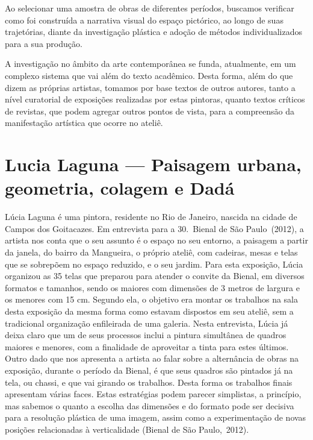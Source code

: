 Ao selecionar uma amostra de obras de diferentes períodos, buscamos
verificar como foi construída a narrativa visual do espaço pictórico,
ao longo de suas trajetórias, diante da investigação plástica e adoção
de métodos individualizados para a sua produção.

\newpage

A investigação no âmbito da arte contemporânea se funda, atualmente, em
um complexo sistema que vai além do texto acadêmico. Desta forma, além
do que dizem as próprias artistas, tomamos por base textos de outros
autores, tanto a nível curatorial de exposições realizadas por estas
pintoras, quanto textos críticos de revistas, que podem agregar outros
pontos de vista, para a compreensão da manifestação artística que
ocorre no ateliê.

\section{Lucia Laguna --- Paisagem urbana, geometria, colagem e Dadá}%
\label{sec:lucia-laguna-paisagem-urbana-geometria-colagem-e-daduxe1}

Lúcia Laguna é uma pintora, residente no Rio de Janeiro, nascida na
cidade de Campos dos Goitacazes. Em entrevista para a 30\textordfeminine.~Bienal de
São Paulo~(2012), a artista nos conta que o seu assunto é o espaço no
seu entorno, a paisagem a partir da janela, do bairro da Mangueira, o
próprio ateliê, com cadeiras, mesas e telas que se sobrepõem no espaço
reduzido, e o seu jardim. Para esta exposição, Lúcia organizou as 35
telas que preparou para atender o convite da Bienal, em diversos
formatos e tamanhos, sendo os maiores com dimensões de 3 metros de
largura e os menores com 15 cm. Segundo ela, o objetivo era montar os
trabalhos na sala desta exposição da mesma forma como estavam dispostos
em seu ateliê, sem a tradicional organização enfileirada de uma
galeria. Nesta entrevista, Lúcia já deixa claro que um de seus
processos inclui a pintura simultânea de quadros maiores e menores, com
a finalidade de aproveitar a tinta para estes últimos. Outro dado que
nos apresenta a artista ao falar sobre a alternância de obras na
exposição, durante o período da Bienal, é que seus quadros são pintados
já na tela, ou chassi, e que vai girando os trabalhos. Desta forma os
trabalhos finais apresentam várias faces. Estas estratégias podem
parecer simplistas, a princípio, mas sabemos o quanto a escolha das
dimensões e do formato pode ser decisiva para a resolução plástica de
uma imagem, assim como a experimentação de novas posições relacionadas
à verticalidade (Bienal de São Paulo,~2012).

